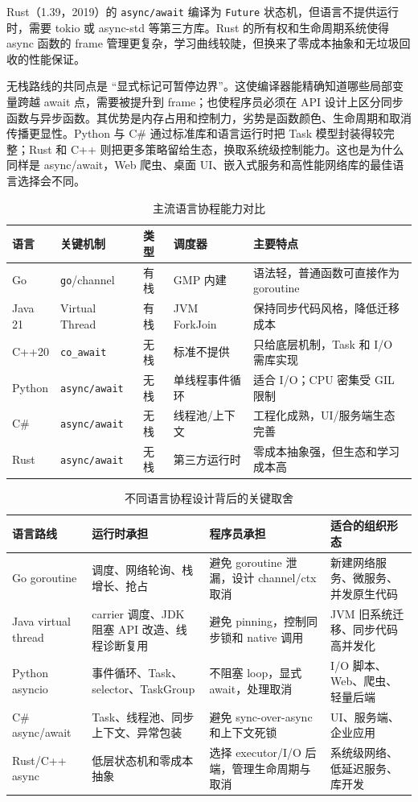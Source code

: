 \documentclass[UTF8,a4paper,12pt]{ctexart}
\begin{document}
Rust（1.39，2019）的 \verb|async/await| 编译为 \verb|Future| 状态机，但语言不提供运行时，需要 tokio 或 async-std 等第三方库。Rust 的所有权和生命周期系统使得 async 函数的 frame 管理更复杂，学习曲线较陡，但换来了零成本抽象和无垃圾回收的性能保证。

无栈路线的共同点是 ``显式标记可暂停边界''。这使编译器能精确知道哪些局部变量跨越 await 点，需要被提升到 frame；也使程序员必须在 API 设计上区分同步函数与异步函数。其优势是内存占用和控制力，劣势是函数颜色、生命周期和取消传播更显性。Python 与 C\# 通过标准库和语言运行时把 Task 模型封装得较完整；Rust 和 C++ 则把更多策略留给生态，换取系统级控制能力。这也是为什么同样是 async/await，Web 爬虫、桌面 UI、嵌入式服务和高性能网络库的最佳语言选择会不同。

\begin{table}[H]
  \centering
  \caption{主流语言协程能力对比}
  \begin{tabularx}{\textwidth}{lXXXX}
    \toprule
    语言 & 关键机制 & 类型 & 调度器 & 主要特点 \\
    \midrule
    Go & \texttt{go}/channel & 有栈 & GMP 内建 & 语法轻，普通函数可直接作为 goroutine \\
    Java 21 & Virtual Thread & 有栈 & JVM ForkJoin & 保持同步代码风格，降低迁移成本 \\
    C++20 & \texttt{co\_await} & 无栈 & 标准不提供 & 只给底层机制，Task 和 I/O 需库实现 \\
    Python & \texttt{async/await} & 无栈 & 单线程事件循环 & 适合 I/O；CPU 密集受 GIL 限制 \\
    C\# & \texttt{async/await} & 无栈 & 线程池/上下文 & 工程化成熟，UI/服务端生态完善 \\
    Rust & \texttt{async/await} & 无栈 & 第三方运行时 & 零成本抽象强，但生态和学习成本高 \\
    \bottomrule
  \end{tabularx}
\end{table}

\begin{table}[H]
  \centering
  \caption{不同语言协程设计背后的关键取舍}
  \begin{tabularx}{\textwidth}{lXXX}
    \toprule
    语言路线 & 运行时承担 & 程序员承担 & 适合的组织形态 \\
    \midrule
    Go goroutine & 调度、网络轮询、栈增长、抢占 & 避免 goroutine 泄漏，设计 channel/ctx 取消 & 新建网络服务、微服务、并发原生代码 \\
    Java virtual thread & carrier 调度、JDK 阻塞 API 改造、线程诊断复用 & 避免 pinning，控制同步锁和 native 调用 & JVM 旧系统迁移、同步代码高并发化 \\
    Python asyncio & 事件循环、Task、selector、TaskGroup & 不阻塞 loop，显式 await，处理取消 & I/O 脚本、Web、爬虫、轻量后端 \\
    C\# async/await & Task、线程池、同步上下文、异常包装 & 避免 sync-over-async 和上下文死锁 & UI、服务端、企业应用 \\
    Rust/C++ async & 低层状态机和零成本抽象 & 选择 executor/I/O 后端，管理生命周期与取消 & 系统级网络、低延迟服务、库开发 \\
    \bottomrule
  \end{tabularx}
  \label{tab:language-tradeoff}
\end{table}
\end{document}
